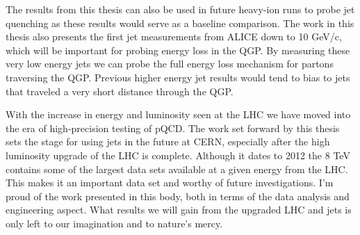 The results from this thesis can also be used in future heavy-ion runs to probe jet quenching as these results would serve as a baseline comparison.  The work in this thesis also presents the first jet measurements from ALICE down to 10 GeV/c, which will be important for probing energy loss in the QGP.  By measuring these very low energy jets we can probe the full energy loss mechanism for partons traversing the QGP.  Previous higher energy jet results would tend to bias to jets that traveled a very short distance through the QGP.

With the increase in energy and luminosity seen at the LHC we have moved into the era of high-precision testing of pQCD.  The work set forward by this thesis sets the stage for using jets in the future at CERN, especially after the high luminosity upgrade of the LHC is complete.  Although it dates to 2012 the 8 TeV contains some of the largest data sets available at a given energy from the LHC.  This makes it an important data set and worthy of future investigations.  I'm proud of the work presented in this body, both in terms of the data analysis and engineering aspect.  What results we will gain from the upgraded LHC and jets is only left to our imagination and to nature's mercy.